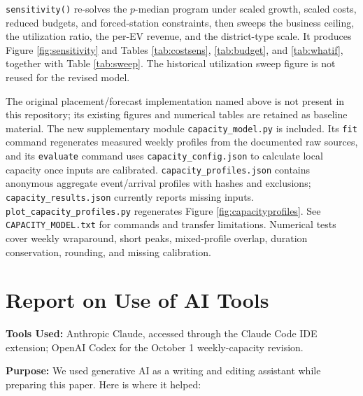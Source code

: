 \documentclass[12pt]{article}
\begin{document}
\texttt{sensitivity()} re-solves the $p$-median program under scaled growth, scaled costs,
reduced budgets, and forced-station constraints, then sweeps the business ceiling, the
utilization ratio, the per-EV revenue, and the district-type scale. It produces Figure
\ref{fig:sensitivity} and Tables \ref{tab:costsens}, \ref{tab:budget}, and \ref{tab:whatif},
together with Table \ref{tab:sweep}. The historical utilization sweep figure is
not reused for the revised model.

The original placement/forecast implementation named above is not present in this
repository; its existing figures and numerical tables are retained as baseline material.
The new supplementary module \texttt{capacity\_model.py} is included. Its
\texttt{fit} command regenerates measured weekly profiles from the documented raw sources,
and its \texttt{evaluate} command uses \texttt{capacity\_config.json} to calculate local
capacity once inputs are calibrated. \texttt{capacity\_profiles.json} contains anonymous
aggregate event/arrival profiles with hashes and exclusions;
\texttt{capacity\_results.json} currently reports missing inputs.
\texttt{plot\_capacity\_profiles.py} regenerates Figure \ref{fig:capacityprofiles}.
See \texttt{CAPACITY\_MODEL.txt} for commands and transfer limitations. Numerical tests
cover weekly wraparound, short peaks, mixed-profile overlap, duration conservation,
rounding, and missing calibration.

\newpage

\section*{Report on Use of AI Tools}

\textbf{Tools Used:} Anthropic Claude, accessed through the Claude Code IDE extension;
OpenAI Codex for the October 1 weekly-capacity revision.

\textbf{Purpose:} We used generative AI as a writing and editing assistant while preparing
this paper. Here is where it helped:
\end{document}
